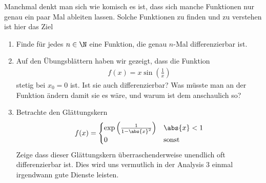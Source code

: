 \begin{exercise}
  Manchmal denkt man sich wie komisch es ist, dass sich manche Funktionen nur
  genau ein paar Mal ableiten lassen. Solche Funktionen zu finden und zu
  verstehen ist hier das Ziel
  \begin{enumerate}[label=(\alph*)]
  \item Finde für jedes $n \in \N$ eine Funktion, die genau $n$-Mal
    differenzierbar ist.
  \item Auf den Übungsblättern haben wir gezeigt, dass die Funktion
    \begin{equation*}
      \begin{split}
        f(x) = x \sin \left( \frac{1}{x} \right)
      \end{split}
    \end{equation*}
    stetig bei $x_0 = 0$ ist. Ist sie auch differenzierbar? Was müsste man an
    der Funktion ändern damit sie es wäre, und warum ist dem anschaulich so?
  \item Betrachte den Glättungskern
    \begin{equation*}
      f(x) =
      \begin{cases}
        \exp \left( \frac{1}{1 - \abs{x}^2} \right) & \abs{x} < 1  \\
        0                                           & \text{sonst} \\
      \end{cases}
    \end{equation*}
    Zeige dass dieser Glättungskern überraschenderweise unendlich oft
    differenzierbar ist. Dies wird uns vermutlich in der Analysis 3 einmal
    irgendwann gute Dienste leisten.
  \end{enumerate}
\end{exercise}
